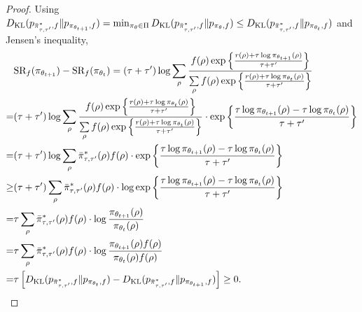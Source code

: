 \begin{proof}
	Using $D_{\mathrm{KL}}(p_{\bar{\pi}_{\tau,\tau^{\prime}}^*, f} \| p_{\pi_{\theta_{t+1}}, f}) = \min_{\pi_\theta \in \Pi}{ D_{\mathrm{KL}}(p_{\bar{\pi}_{\tau,\tau^{\prime}}^*, f}  \| p_{\pi_\theta, f} ) } \le D_{\mathrm{KL}}(p_{\bar{\pi}_{\tau,\tau^{\prime}}^*, f} \| p_{\pi_{\theta_t}, f})$ and Jensen's inequality,
	\begin{equation*}
	\begin{split}
	&\text{SR}_f(\pi_{\theta_{t+1}}) - \text{SR}_f(\pi_{\theta_t}) = (\tau + \tau^{\prime}) \log{ \sum\limits_{\rho}{ \frac{ f(\rho) \exp\left\{ \frac{r(\rho) + \tau \log{\pi_{\theta_{t+1}}(\rho)} }{\tau + \tau^{\prime}} \right\}  }{ \sum\limits_{\rho}{ f(\rho) \exp\left\{ \frac{r(\rho) + \tau \log{\pi_{\theta_t}(\rho)} }{\tau + \tau^{\prime}} \right\} } }  } } \\
	=& (\tau + \tau^{\prime}) \log{ \sum\limits_{\rho}{ \frac{ f(\rho) \exp\left\{ \frac{r(\rho) + \tau \log{\pi_{\theta_t}(\rho)} }{\tau + \tau^{\prime}} \right\}  }{ \sum\limits_{\rho}{ f(\rho) \exp\left\{ \frac{r(\rho) + \tau \log{\pi_{\theta_t}(\rho)} }{\tau + \tau^{\prime}} \right\} } }  } \cdot \exp\left\{ \frac{\tau \log{\pi_{\theta_{t+1}}(\rho)} - \tau \log{\pi_{\theta_t}(\rho)} }{\tau + \tau^{\prime}} \right\} } \\
	=& (\tau + \tau^{\prime}) \log{ \sum\limits_{\rho}{ \bar{\pi}_{\tau,\tau^{\prime}}^*(\rho) f(\rho) } \cdot \exp\left\{ \frac{\tau \log{\pi_{\theta_{t+1}}(\rho)} - \tau \log{\pi_{\theta_t}(\rho)} }{\tau + \tau^{\prime}} \right\} } \\
	\ge& (\tau + \tau^{\prime}) \sum\limits_{\rho}{ \bar{\pi}_{\tau,\tau^{\prime}}^*(\rho) f(\rho) \cdot \log{ \exp\left\{ \frac{\tau \log{\pi_{\theta_{t+1}}(\rho)} - \tau \log{\pi_{\theta_t}(\rho)} }{\tau + \tau^{\prime}} \right\} } } \\
	=& \tau \sum\limits_{\rho}{ \bar{\pi}_{\tau,\tau^{\prime}}^*(\rho) f(\rho) \cdot \log{ \frac{\pi_{\theta_{t+1}}(\rho)}{\pi_{\theta_t}(\rho)} } } \\
	=& \tau \sum\limits_{\rho}{ \bar{\pi}_{\tau,\tau^{\prime}}^*(\rho) f(\rho) \cdot \log{ \frac{ \pi_{\theta_{t+1}}(\rho) f(\rho) }{ \pi_{\theta_t}(\rho) f(\rho)} } } \\
	=& \tau \left[ D_{\mathrm{KL}}(p_{\bar{\pi}_{\tau,\tau^{\prime}}^*, f} \| p_{\pi_{\theta_t}, f}) - D_{\mathrm{KL}}(p_{\bar{\pi}_{\tau,\tau^{\prime}}^*, f} \| p_{\pi_{\theta_{t+1}}, f}) \right] \ge 0. \qedhere
	\end{split}
	\end{equation*}
\end{proof}

